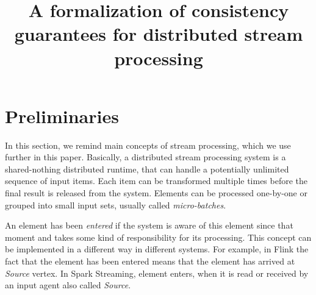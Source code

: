 \documentclass[sigconf]{acmart}
\theoremstyle{remark}
\begin{document}
\title {A formalization of consistency guarantees for distributed stream processing}



\maketitle

\section{Preliminaries}

In this section, we remind main concepts of stream processing, which we use further in this paper. Basically, a distributed stream processing system is a shared-nothing distributed runtime, that can handle a potentially unlimited sequence of input items. Each item can be transformed multiple times before the final result is released from the system. Elements can be processed one-by-one or grouped into small input sets, usually called {\em micro-batches}. 

An element has been {\em entered} if the system is aware of this element since that moment and takes some kind of responsibility for its processing. This concept can be implemented in a different way in different systems. For example, in Flink the fact that the element has been entered means that the element has arrived at {\em Source} vertex. In Spark Streaming, element enters, when it is read or received by an input agent also called {\em Source}. 
\end{document}
